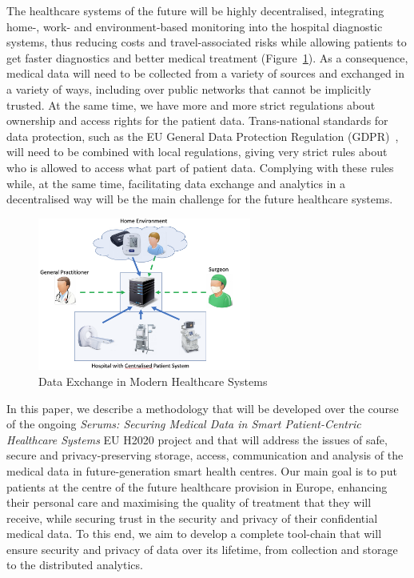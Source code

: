 \noindent
The healthcare systems of the future will be highly decentralised, integrating home-, work- and environment-based monitoring into the hospital diagnostic systems, thus reducing costs and travel-associated risks while allowing patients to get faster diagnostics and better medical treatment (Figure~\ref{fig:dataExch}). As a consequence, medical data will need to be collected from a variety of sources and exchanged in a variety of ways, including over public networks that cannot be implicitly trusted. At the same time, we have more and more strict regulations about ownership and access rights for the patient data. Trans-national standards for data protection, such as the EU General Data Protection Regulation (GDPR)~\cite{gdpr}, will need to be combined with local regulations, giving very strict rules about who is allowed to access what part of patient data. Complying with these rules while, at the same time, facilitating data exchange and analytics in a decentralised way will be the main challenge for the future healthcare systems.

\begin{figure}[t!]
    \centering
    \includegraphics[width=70mm]{images/DataExchange.png}
    \caption{Data Exchange in Modern Healthcare Systems}
    \label{fig:dataExch}
\end{figure}

In this paper, we describe a methodology that will be developed over the course of the ongoing \emph{Serums: Securing Medical Data in Smart Patient-Centric Healthcare Systems} EU H2020 project and that will address the issues of safe, secure and privacy-preserving storage, access, communication and analysis of the medical data in future-generation smart health centres. Our main goal is to put patients at the centre of the future healthcare provision in Europe, enhancing their personal care and maximising the quality of treatment that they will receive, while securing trust in the security and privacy of their confidential medical data. To this end, we aim to develop a complete tool-chain that will ensure security and privacy of data over its lifetime, from collection and storage to the distributed analytics.

